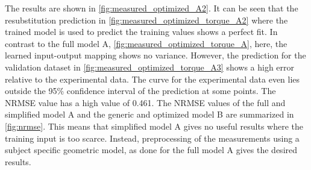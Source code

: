 The results are shown in \cref{fig:measured_optimized_A2}. It can be seen that the resubstitution prediction in \cref{fig:measured_optimized_torque_A2} where the trained model is used to predict the training values shows a perfect fit. In contrast to the full model A, \cref{fig:measured_optimized_torque_A}, here, the learned input-output mapping shows no variance. However, the prediction for the validation dataset in \cref{fig:measured_optimized_torque_A3} shows a high error relative to the experimental data. The curve for the experimental data even lies outside the 95\% confidence interval of the prediction at some points. The NRMSE value has a high value of 0.461. 
The NRMSE values of the full and simplified model A and the generic and optimized model B are summarized in \cref{fig:nrmse}.
This means that simplified model A gives no useful results where the training input is too scarce. Instead, preprocessing of the measurements using a subject specific geometric model, as done for the full model A gives the desired results.

